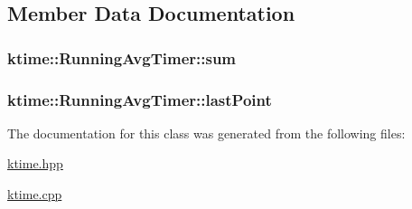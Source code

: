 \subsection{Member Data Documentation}
\hypertarget{classktime_1_1_running_avg_timer_a6a22c54aaa6acb0a414f1c276a31ee1c}{
\subsubsection[{sum}]{ {\bf ktime\-::\-Running\-Avg\-Timer\-::sum}}}\label{classktime_1_1_running_avg_timer_a6a22c54aaa6acb0a414f1c276a31ee1c}
\hypertarget{classktime_1_1_running_avg_timer_aebd941b0d88a2ea2a5b9fe48b6466f56}{
\subsubsection[{last\-Point}]{ {\bf ktime\-::\-Running\-Avg\-Timer\-::last\-Point}}}\label{classktime_1_1_running_avg_timer_aebd941b0d88a2ea2a5b9fe48b6466f56}


The documentation for this class was generated from the following files\-:\begin{DoxyCompactItemize}
\item 
\hyperlink{ktime_8hpp}{ktime.\-hpp}\item 
\hyperlink{ktime_8cpp}{ktime.\-cpp}\end{DoxyCompactItemize}
